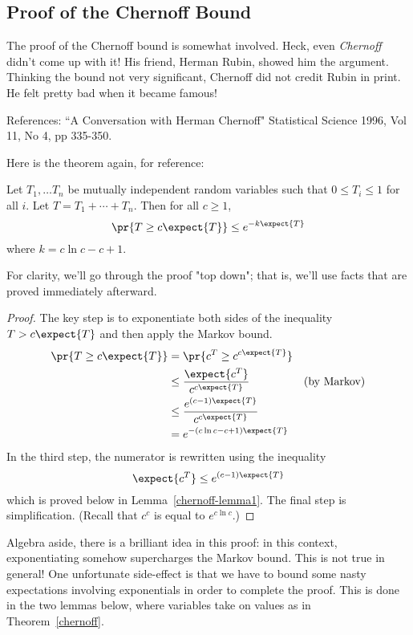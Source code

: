 \subsection{Proof of the Chernoff Bound}

The proof of the Chernoff bound is somewhat involved.  Heck, even {\em
  Chernoff} didn't come up with it!  His friend, Herman Rubin, showed
him the argument.  Thinking the bound not very significant, Chernoff
did not credit Rubin in print.  He felt pretty bad when it became
famous!
\begin{editingnotes}
 References: ``A Conversation with Herman Chernoff" Statistical
 Science 1996, Vol 11, No 4, pp 335-350.

Here is the theorem again, for reference:

\begin{theorem}
Let $T_1, \dots T_n$ be mutually independent random variables such
that $0 \leq T_i \leq 1$ for all $i$.  Let $T = T_1 + \cdots + T_n$.
Then for all $c \geq 1$,
\[
\pr{T \geq c \expect{T}} \leq e^{- k \expect{T}}
\]
where $k = c \ln c - c + 1$.
\end{theorem}
\end{editingnotes}

For clarity, we'll go through the proof "top down"; that is, we'll use
facts that are proved immediately afterward.

\begin{proof} The key step is to exponentiate both sides of the
  inequality $T > c \expect{T}$ and then apply the Markov bound.
\begin{align*}
\pr{T \geq c \expect{T}} & = \pr{c^T \geq c^{c \expect{T}}} \\
  & \leq \frac{\expect{c^T}}{c^{c \expect{T}}} & \text{(by Markov)}\\
  & \leq \frac{e^{(c-1) \expect{T}}}{c^{c \expect{T}}} \\
  & = e^{- (c \ln c - c + 1) \expect{T}}
\end{align*}
In the third step, the numerator is rewritten using the inequality
\[
\expect{c^T} \leq e^{(c-1) \expect{T}}
\]
which is proved below in Lemma~\ref{chernoff-lemma1}.  The final step
is simplification.  (Recall that $c^c$ is equal to $e ^{c \ln c}$.)
\end{proof}

Algebra aside, there is a brilliant idea in this proof: in this
context, exponentiating somehow supercharges the Markov bound.  This
is not true in general!  One unfortunate side-effect is that we have
to bound some nasty expectations involving exponentials in order to
complete the proof.  This is done in the two lemmas below, where
variables take on values as in Theorem~\ref{chernoff}.

